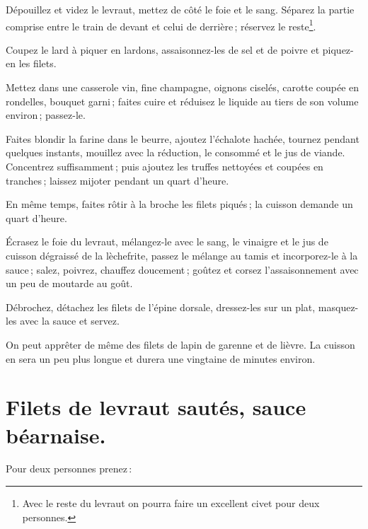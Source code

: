 Dépouillez et videz le levraut, mettez de côté le foie et le sang. Séparez la
partie comprise entre le train de devant et celui de derrière ; réservez le
reste\footnote{Avec le reste du levraut on pourra faire un excellent civet pour
deux personnes.}.

Coupez le lard à piquer en lardons, assaisonnez-les de sel et de poivre et
piquez-en les filets.

Mettez dans une casserole vin, fine champagne, oignons ciselés, carotte coupée
en rondelles, bouquet garni ; faites cuire et réduisez le liquide au tiers de son
volume environ ; passez-le.

Faites blondir la farine dans le beurre, ajoutez l'échalote hachée, tournez
pendant quelques instants, mouillez avec la réduction, le consommé et le jus de
viande. Concentrez suffisamment ; puis ajoutez les truffes nettoyées et coupées
en tranches ; laissez mijoter pendant un quart d'heure.

En même temps, faites rôtir à la broche les filets piqués ; la cuisson demande
un quart d'heure.

Écrasez le foie du levraut, mélangez-le avec le sang, le vinaigre et le jus de
cuisson dégraissé de la lèchefrite, passez le mélange au tamis et incorporez-le
à la sauce ; salez, poivrez, chauffez doucement ; goûtez et corsez
l'assaisonnement avec un peu de moutarde au goût.

Débrochez, détachez les filets de l'épine dorsale, dressez-les sur un plat,
masquez-les avec la sauce et servez.

\sk

On peut apprêter de même des filets de lapin de garenne et de lièvre. La
cuisson en sera un peu plus longue et durera une vingtaine de minutes environ.

\section*{\centering Filets de levraut sautés, sauce béarnaise.}
{}

Pour deux personnes prenez :

